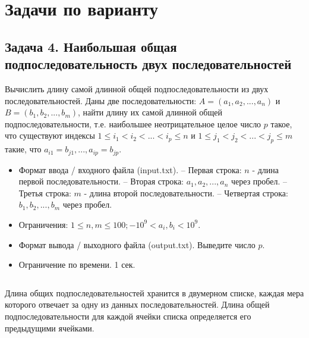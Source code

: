 \section*{Задачи по варианту}




\subsection*{Задача 4. Наибольшая общая подпоследовательность двух последовательностей}

Вычислить длину самой длинной общей подпоследовательности из двух
последовательностей. Даны две последовательности: $A = (a_1, a_2, ..., a_n)$ и $B = (b_1, b_2, ..., b_m)$, найти длину их самой длинной общей
подпоследовательности, т.е. наибольшее неотрицательное целое число $p$
такое, что существуют индексы $ 1 \le i_1 < i_2 < ... < i_p \le n$ и $ 1 \le j_1 < j_2 < ... < j_p \le m $ такие, что $ a_{i1} = b_{j1}, ..., a_{ip} = b_{jp}. $

\begin{itemize}
    \item Формат ввода / входного файла (input.txt).
    \newline – Первая строка: $n$ - длина первой последовательности.
    \newline – Вторая строка: $a_1, a_2, ..., a_n$ через пробел.
    \newline – Третья строка: $m$ - длина второй последовательности.
    \newline – Четвертая строка: $b_1, b_2, ..., b_m$ через пробел.
    \item Ограничения: $1 \le n, m \le 100; −10^9 < a_i, b_i < 10^9$.
    \item Формат вывода / выходного файла (output.txt). Выведите число $p$.
    \item Ограничение по времени. 1 сек.
\end{itemize}

\begin{code}
	\inputminted[breaklines=true, xleftmargin=1em, linenos, frame=single, framesep=10pt, fontsize=\footnotesize, firstline=1, lastline=29]{python}{listings/task4.py}
\end{code}
\newline
Длина общих подпоследовательностей хранится в двумерном списке,
каждая мера которого отвечает за одну из данных последовательностей.
Длина общей подпоследовательности для каждой ячейки списка
определяется его предыдущими ячейками.

